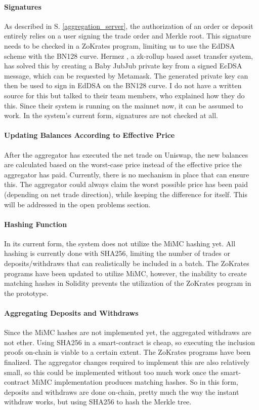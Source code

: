 \documentclass[../../thesis.tex]{subfiles}
\begin{document}
\paragraph{Signatures}
As described in S. \ref{aggregation_server}, the authorization of an order or deposit entirely relies on a user signing the trade order and Merkle root. This signature needs to be checked in a ZoKrates program, limiting us to use the EdDSA scheme with the BN128 curve. Hermez \cite{hermez_docs}, a zk-rollup based asset transfer system, has solved this by creating a Baby JubJub\cite{baylinaeddsa} private key from a signed EcDSA message, which can be requested by Metamask. The generated private key can then be used to sign in EdDSA on the BN128 curve. I do not have a written source for this but talked to their team members, who explained how they do this. Since their system is running on the mainnet now, it can be assumed to work. In the system's current form, signatures are not checked at all.

\paragraph{Updating Balances According to Effective Price}
After the aggregator has executed the net trade on Uniswap, the new balances are calculated based on the worst-case price instead of the effective price the aggregator has paid. Currently, there is no mechanism in place that can ensure this. The aggregator could always claim the worst possible price has been paid (depending on net trade direction), while keeping the difference for itself. This will be addressed in the open problems section.

\paragraph{Hashing Function}
In its current form, the system does not utilize the MiMC hashing yet. All hashing is currently done with SHA256, limiting the number of trades or deposits/withdraws that can realistically be included in a batch. The ZoKrates programs have been updated to utilize MiMC, however, the inability to create matching hashes in Solidity prevents the utilization of the ZoKrates program in the prototype. 

\paragraph{Aggregating Deposits and Withdraws}
Since the MiMC hashes are not implemented yet, the aggregated withdraws are not ether. Using SHA256 in a smart-contract is cheap, so executing the inclusion proofs on-chain is viable to a certain extent. The ZoKrates programs have been finalized. The aggregator changes required to implement this are also relatively small, so this could be implemented without too much work once the smart-contract MiMC implementation produces matching hashes. So in this form, deposits and withdraws are done on-chain, pretty much the way the instant withdraw works, but using SHA256 to hash the Merkle tree. 
\end{document}
